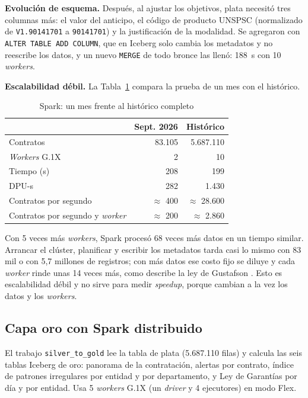 \documentclass[conference]{IEEEtran}
\begin{document}
\textbf{Evolución de esquema.} Después, al ajustar los objetivos, plata necesitó tres columnas más: el valor del anticipo, el código de producto UNSPSC (normalizado de \texttt{V1.90141701} a \texttt{90141701}) y la justificación de la modalidad. Se agregaron con \texttt{ALTER TABLE ADD COLUMN}, que en Iceberg solo cambia los metadatos y no reescribe los datos, y un nuevo \texttt{MERGE} de todo bronce las llenó: 188~s con 10 \textit{workers}.

\textbf{Escalabilidad débil.} La Tabla~\ref{tab:debil} compara la prueba de un mes con el histórico.

\begin{table}[htbp]
\caption{Spark: un mes frente al histórico completo}
\label{tab:debil}
\centering
\begin{tabular}{@{}lrr@{}}
\toprule
 & Sept. 2026 & Histórico \\
\midrule
Contratos & 83.105 & 5.687.110 \\
\textit{Workers} G.1X & 2 & 10 \\
Tiempo (s) & 208 & 199 \\
DPU-s & 282 & 1.430 \\
Contratos por segundo & $\approx$ 400 & $\approx$ 28.600 \\
Contratos por segundo y \textit{worker} & $\approx$ 200 & $\approx$ 2.860 \\
\bottomrule
\end{tabular}
\end{table}

Con 5 veces más \textit{workers}, Spark procesó 68 veces más datos en un tiempo similar. Arrancar el clúster, planificar y escribir los metadatos tarda casi lo mismo con 83 mil o con 5,7 millones de registros; con más datos ese costo fijo se diluye y cada \textit{worker} rinde unas 14 veces más, como describe la ley de Gustafson \cite{gustafson1988}. Esto es escalabilidad débil y no sirve para medir \textit{speedup}, porque cambian a la vez los datos y los \textit{workers}.

\subsection{Capa oro con Spark distribuido}
El trabajo \texttt{silver\_to\_gold} lee la tabla de plata (5.687.110 filas) y calcula las seis tablas Iceberg de oro: panorama de la contratación, alertas por contrato, índice de patrones irregulares por entidad y por departamento, y Ley de Garantías por día y por entidad. Usa 5 \textit{workers} G.1X (un \textit{driver} y 4 ejecutores) en modo Flex.
\end{document}

